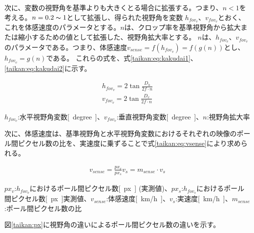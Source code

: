 次に、変数の視野角を基準よりも大きくとる場合に拡張する。つまり、$n<1$を考える。$n = 0.2 \thicksim 1$として拡張し、得られた視野角を変数
$h_{fov_v}$、$v_{fov_v}$とおく、これを体感速度のパラメータとする。$n$は、クロップ率を基準視野角から拡大または縮小するための値として拡張した、視野角拡大率とする。
$n$は、$h_{fov_v}$、$v_{fov_v}$のパラメータである。つまり、体感速度$v_{sense} = f(h_{fov_v}) = f(g(n))$とし、$h_{fov_v}=g(n)$である。
これらの式を、式\eqref{taikan:eq:kakudai1}、\eqref{taikan:eq:kakudai2}に示す。

\begin{align}
  h_{fov_v} = 2\tan{\frac{D_h}{2f\cdot n}} \label{taikan:eq:kakudai1}\\
  v_{fov_v} = 2\tan{\frac{D_v}{2f\cdot n}} \label{taikan:eq:kakudai2}
\end{align}

$h_{fov_v}$:水平視野角変数\si{[degree]}、$v_{fov_v}$:垂直視野角変数\si{[degree]}、$n$:視野角拡大率

次に、体感速度は、基準視野角と水平視野角変数におけるそれぞれの映像のポール間ピクセル数の比を、実速度に乗ずることで式\eqref{taikan:eq:vsense}により求められる。

\begin{align}
  v_{sense} = \frac{px_v}{px_s}v_s = m_{sense}\cdot v_s \label{taikan:eq:vsense}
\end{align}

$px_v$:$h_{fov_v}$におけるポール間ピクセル数\si{[px]} (実測値)、$px_s$:$h_{fov_s}$におけるポール間ピクセル数\si{[px]}実測値、$v_{sense}$:体感速度\si{[km/h]}、$v_s$:実速度\si{[km/h]}、$m_{sense}$:ポール間ピクセル数の比

図\ref{taikan:px}に視野角の違いによるポール間ピクセル数の違いを示す。


